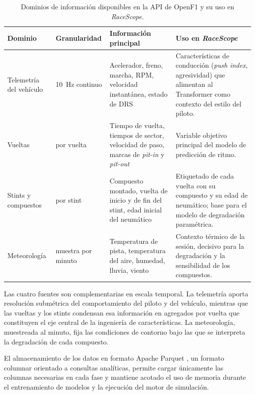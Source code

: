\begin{table}[H]
\centering
\caption{Dominios de información disponibles en la API de OpenF1 y su uso en \textit{RaceScope}.}
\label{tab:openf1_dominios}
\small
\begin{tabularx}{\textwidth}{>{\raggedright\arraybackslash}X>{\raggedright\arraybackslash}X>{\raggedright\arraybackslash}X>{\raggedright\arraybackslash}X}
\toprule
\textbf{Dominio} & \textbf{Granularidad} & \textbf{Información principal} & \textbf{Uso en \textit{RaceScope}} \\
\midrule
Telemetría del vehículo & \SI{10}{Hz} continuo & Acelerador, freno, marcha, RPM, velocidad instantánea, estado de DRS & Características de conducción (\textit{push index}, agresividad) que alimentan al Transformer como contexto del estilo del piloto. \\
\midrule
Vueltas & 1 por vuelta & Tiempo de vuelta, tiempos de sector, velocidad de paso, marcas de \textit{pit-in} y \textit{pit-out} & Variable objetivo principal del modelo de predicción de ritmo. \\
\midrule
Stints y compuestos & 1 por stint & Compuesto montado, vuelta de inicio y de fin del stint, edad inicial del neumático & Etiquetado de cada vuelta con su compuesto y su edad de neumático; base para el modelo de degradación paramétrica. \\
\midrule
Meteorología & 1 muestra por minuto & Temperatura de pista, temperatura del aire, humedad, lluvia, viento & Contexto térmico de la sesión, decisivo para la degradación y la sensibilidad de los compuestos. \\
\bottomrule
\end{tabularx}
\end{table}

Las cuatro fuentes son complementarias en escala temporal. La telemetría aporta resolución submétrica del comportamiento del piloto y del vehículo, mientras que las vueltas y los stints condensan esa información en agregados por vuelta que constituyen el eje central de la ingeniería de características. La meteorología, muestreada al minuto, fija las condiciones de contorno bajo las que se interpreta la degradación de cada compuesto. 

El almacenamiento de los datos en formato Apache Parquet \cite{parquet}, un formato columnar orientado a consultas analíticas, permite cargar únicamente las columnas necesarias en cada fase y mantiene acotado el uso de memoria durante el entrenamiento de modelos y la ejecución del motor de simulación.

